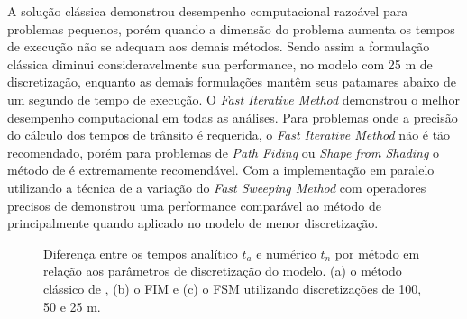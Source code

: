 A solução clássica demonstrou desempenho computacional razoável para problemas pequenos, porém quando a dimensão do problema aumenta os tempos de execução não se adequam aos demais métodos. Sendo assim a formulação clássica diminui consideravelmente sua performance, no modelo com 25 m de discretização, enquanto as demais formulações mantêm seus patamares abaixo de um segundo de tempo de execução. O \textit{Fast Iterative Method} demonstrou o melhor desempenho computacional em todas as análises. Para problemas onde a precisão do cálculo dos tempos de trânsito é requerida, o \textit{Fast Iterative Method} não é tão recomendado, porém para problemas de \textit{Path Fiding} ou \textit{Shape from Shading} o método de  é extremamente recomendável. Com a implementação em paralelo utilizando a técnica de  a variação do \textit{Fast Sweeping Method} com operadores precisos de  demonstrou uma performance comparável ao método de  principalmente quando aplicado no modelo de menor discretização.  

\begin{figure}[H]
	\centering
	\newline
	\newline
	\newline
		
	\caption{Diferença entre os tempos analítico $t_a$ e numérico $t_n$ por método em relação aos parâmetros de discretização do modelo. (a) o método clássico de , (b) o FIM e (c) o FSM utilizando discretizações de 100, 50 e 25 m.}
	\label{fig:precision_refraction_study}	
\end{figure}

